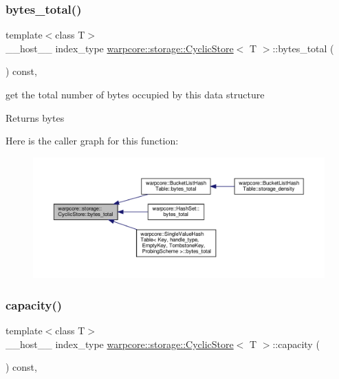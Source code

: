 \subsubsection{\texorpdfstring{bytes\+\_\+total()}{bytes\_total()}}
{\footnotesize\ttfamily template$<$class T$>$ \\
\+\_\+\+\_\+host\+\_\+\+\_\+ index\+\_\+type \hyperlink{classwarpcore_1_1storage_1_1CyclicStore}{warpcore\+::storage\+::\+Cyclic\+Store}$<$ T $>$\+::bytes\+\_\+total (\begin{DoxyParamCaption}{ }\end{DoxyParamCaption}) const\hspace{0.3cm}{\ttfamily [inline]}, {\ttfamily [noexcept]}}



get the total number of bytes occupied by this data structure 

\begin{DoxyReturn}{Returns}
bytes 
\end{DoxyReturn}
Here is the caller graph for this function\+:
\nopagebreak
\begin{figure}[H]
\begin{center}
\leavevmode
\includegraphics[width=350pt]{classwarpcore_1_1storage_1_1CyclicStore_ae65e099d0cfe170fc4cd2f02682c3bda_icgraph}
\end{center}
\end{figure}
\mbox{\label{classwarpcore_1_1storage_1_1CyclicStore_acc4bfbb9b10868a193301d0ec5a46711}} 
\subsubsection{\texorpdfstring{capacity()}{capacity()}}
{\footnotesize\ttfamily template$<$class T$>$ \\
\+\_\+\+\_\+host\+\_\+\+\_\+ index\+\_\+type \hyperlink{classwarpcore_1_1storage_1_1CyclicStore}{warpcore\+::storage\+::\+Cyclic\+Store}$<$ T $>$\+::capacity (\begin{DoxyParamCaption}{ }\end{DoxyParamCaption}) const\hspace{0.3cm}{\ttfamily [inline]}, {\ttfamily [noexcept]}}



